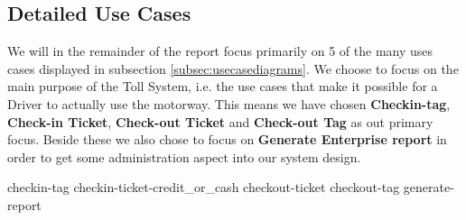 \newpage
\subsection{Detailed Use Cases}
\label{subsec:detailedusecases}
\label{sec:usecase}
We will in the remainder of the report focus primarily on 5 of the many uses cases displayed in subsection \ref{subsec:usecasediagrams}. We choose to focus on the main purpose of the Toll System, i.e. the use cases that make it possible for a Driver to actually use the motorway. This means we have chosen \textbf{Checkin-tag}, \textbf{Check-in Ticket}, \textbf{Check-out Ticket} and \textbf{Check-out Tag} as out primary focus. Beside these we also chose to focus on \textbf{Generate Enterprise report} in order to get some administration aspect into our system design. 

{checkin-tag}
\newpage
{checkin-ticket-credit_or_cash}
\newpage
{checkout-ticket}
\newpage
{checkout-tag}
\newpage
{generate-report}
\newpage